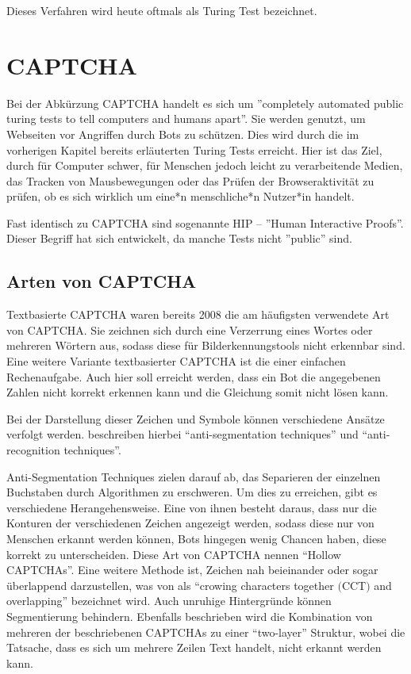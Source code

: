 Dieses Verfahren wird heute oftmals als Turing Test bezeichnet. 

\section{CAPTCHA}
\label{ch:basics:captcha}
Bei der Abkürzung CAPTCHA handelt es sich um ''completely automated public turing tests to tell computers and humans apart''. 
Sie werden genutzt, um Webseiten vor Angriffen durch Bots zu schützen. 
Dies wird durch die im vorherigen Kapitel bereits erläuterten Turing Tests erreicht. 
Hier ist das Ziel, durch für Computer schwer, für Menschen jedoch leicht zu verarbeitende Medien, das Tracken von Mausbewegungen
oder das Prüfen der Browseraktivität zu prüfen, ob es sich wirklich um eine*n menschliche*n Nutzer*in handelt.

Fast identisch zu CAPTCHA sind sogenannte HIP – ''Human Interactive Proofs''. 
Dieser Begriff hat sich entwickelt, da manche Tests nicht ''public'' sind. \cite[p.1]{chellapilla} \cite{tutorial} 

\subsection{Arten von CAPTCHA}
\label{ch:basics:captcha:arten}
Textbasierte CAPTCHA waren bereits 2008 die am häufigsten verwendete Art von CAPTCHA.
Sie zeichnen sich durch eine Verzerrung eines Wortes oder mehreren Wörtern aus, sodass diese für Bilderkennungstools nicht erkennbar sind.
Eine weitere Variante textbasierter CAPTCHA ist die einer einfachen Rechenaufgabe. 
Auch hier soll erreicht werden, dass ein Bot die angegebenen Zahlen nicht korrekt erkennen kann und die Gleichung somit nicht lösen kann. \cite{usabilityofcaptchas} \cite[p.75]{surveyofresearch} \cite{shinde2018DIFFERENTTO} %

Bei der Darstellung dieser Zeichen und Symbole können verschiedene Ansätze verfolgt werden.
\citeauthor{surveyofresearch} beschreiben hierbei ``anti-segmentation techniques'' und ``anti-recognition techniques''. \cite[p.76]{surveyofresearch}

Anti-Segmentation Techniques zielen darauf ab, das Separieren der einzelnen Buchstaben durch Algorithmen zu erschweren. 
Um dies zu erreichen, gibt es verschiedene Herangehensweise.
Eine von ihnen besteht daraus, dass nur die Konturen der verschiedenen Zeichen angezeigt werden, sodass diese nur von Menschen erkannt werden können,
Bots hingegen wenig Chancen haben, diese korrekt zu unterscheiden. Diese Art von CAPTCHA nennen \citeauthor[p.76]{surveyofresearch} ``Hollow CAPTCHAs''. %
Eine weitere Methode ist, Zeichen nah beieinander oder sogar überlappend darzustellen, 
was von \citeauthor{surveyofresearch} als ``crowing characters together $($CCT$)$ and overlapping'' bezeichnet wird.
Auch unruhige Hintergründe können Segmentierung behindern.
Ebenfalls beschrieben wird die Kombination von mehreren der beschriebenen CAPTCHAs zu einer ``two-layer'' Struktur,
wobei die Tatsache, dass es sich um mehrere Zeilen Text handelt, nicht erkannt werden kann. \cite[p.76]{surveyofresearch}

